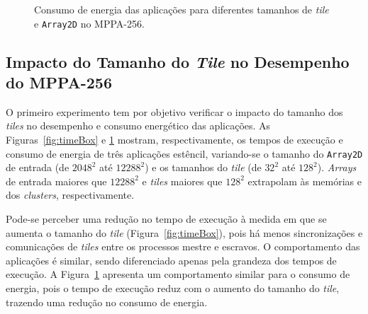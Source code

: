 \documentclass[12pt]{article}
\newcommand{\mppa}{MPPA-256\xspace}
\begin{document}
\begin{figure}[t]
	\centering
	\qquad
    \qquad
	\caption{Consumo de energia das aplicações para diferentes tamanhos de \textit{tile} e \texttt{Array2D} no \mppa.}
	\label{fig:energyBox}
\end{figure}

\subsection{Impacto do Tamanho do \textit{Tile} no Desempenho do \mppa}

O primeiro experimento tem por objetivo verificar o impacto do tamanho dos
\textit{tiles} no desempenho e consumo energético das aplicações. As
Figuras~\ref{fig:timeBox} e \ref{fig:energyBox} mostram, respectivamente, os
tempos de execução e consumo de energia de três aplicações estêncil, variando-se
o tamanho do \texttt{Array2D} de entrada (de $2048^2$ até $12288^2$) e os
tamanhos do \textit{tile} (de $32^2$ até $128^2$). \textit{Arrays} de entrada
maiores que $12288^2$ e \textit{tiles} maiores que $128^2$ extrapolam às
memórias \lpddr e dos \textit{clusters}, respectivamente.

Pode-se perceber uma redução no tempo de execução à medida em que se aumenta o
tamanho do \textit{tile} (Figura~\ref{fig:timeBox}), pois há menos
sincronizações e comunicações de \textit{tiles} entre os processos mestre e
escravos. O comportamento das aplicações é similar, sendo diferenciado apenas
pela grandeza dos tempos de execução.
A Figura~\ref{fig:energyBox} apresenta um comportamento similar para o consumo
de energia, pois o tempo de execução reduz com o aumento do tamanho do
\textit{tile}, trazendo uma redução no consumo de energia.
\end{document}
